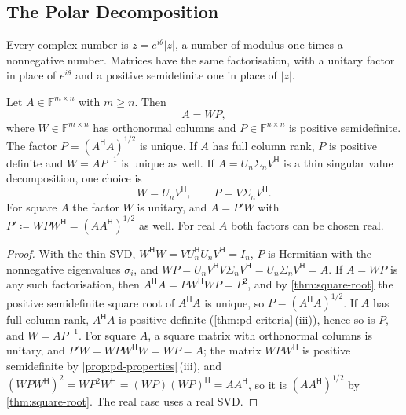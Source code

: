 \subsection{The Polar Decomposition}

Every complex number is $z=e^{i\theta}|z|$, a number of modulus one times a nonnegative number. Matrices have the same factorisation, with a unitary factor in place of $e^{i\theta}$ and a positive semidefinite one in place of $|z|$.

\begin{theorem}
\label{thm:polar}
Let $A\in\mathbb F^{m\times n}$ with $m\ge n$. Then
\[
A=WP,
\]
where $W\in\mathbb F^{m\times n}$ has orthonormal columns and $P\in\mathbb F^{n\times n}$ is positive semidefinite. The factor $P=(A^{\mathsf H}A)^{1/2}$ is unique. If $A$ has full column rank, $P$ is positive definite and $W=AP^{-1}$ is unique as well. If $A=U_n\Sigma_nV^{\mathsf H}$ is a thin singular value decomposition, one choice is
\[
W=U_nV^{\mathsf H},\qquad P=V\Sigma_nV^{\mathsf H}.
\]
For square $A$ the factor $W$ is unitary, and $A=P'W$ with $P'\coloneqq WPW^{\mathsf H}=(AA^{\mathsf H})^{1/2}$ as well. For real $A$ both factors can be chosen real.
\end{theorem}

\begin{proof}
With the thin SVD, $W^{\mathsf H}W=VU_n^{\mathsf H}U_nV^{\mathsf H}=I_n$, $P$ is Hermitian with the nonnegative eigenvalues $\sigma_i$, and $WP=U_nV^{\mathsf H}V\Sigma_nV^{\mathsf H}=U_n\Sigma_nV^{\mathsf H}=A$. If $A=WP$ is any such factorisation, then $A^{\mathsf H}A=PW^{\mathsf H}WP=P^2$, and by \cref{thm:square-root} the positive semidefinite square root of $A^{\mathsf H}A$ is unique, so $P=(A^{\mathsf H}A)^{1/2}$. If $A$ has full column rank, $A^{\mathsf H}A$ is positive definite (\cref{thm:pd-criteria}\,(iii)), hence so is $P$, and $W=AP^{-1}$. For square $A$, a square matrix with orthonormal columns is unitary, and $P'W=WPW^{\mathsf H}W=WP=A$; the matrix $WPW^{\mathsf H}$ is positive semidefinite by \cref{prop:pd-properties}\,(iii), and $(WPW^{\mathsf H})^2=WP^2W^{\mathsf H}=(WP)(WP)^{\mathsf H}=AA^{\mathsf H}$, so it is $(AA^{\mathsf H})^{1/2}$ by \cref{thm:square-root}. The real case uses a real SVD.
\end{proof}

